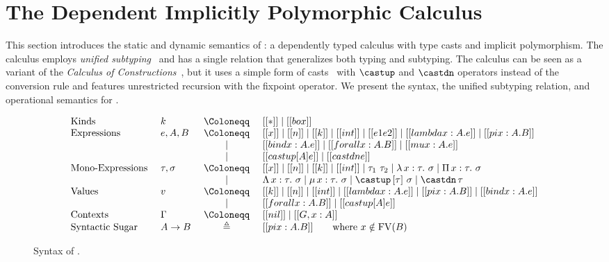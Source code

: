 \section{The Dependent Implicitly Polymorphic Calculus}
\label{sec:system}

This section introduces the static and dynamic semantics of
\name: a dependently typed calculus with type casts
and implicit polymorphism. The calculus employs
\emph{unified subtyping}~\citep{full}
and has a single relation that generalizes both typing and subtyping.
The calculus can be seen as a variant of the \emph{Calculus of Constructions}~\citep{coc},
but it uses a simple form of casts~\citep{isotype,yang2019pure} with $\castup$ and $\castdn$ operators
instead of the conversion rule and features unrestricted recursion with the fixpoint operator.
We present the syntax, the unified subtyping relation, and operational semantics for \name.

\begin{figure}[t]
\centering
\begin{equation*}
\begin{array}{llcl}
    \text{Kinds} & k & ~\Coloneqq ~ & [[*]] \mid [[box]] \\
    \text{Expressions} & e, A, B & ~ \Coloneqq ~ & [[x]] \mid [[n]] \mid [[k]] \mid [[int]] \mid [[e1 e2]] \mid [[lambda x : A. e]] \mid [[pi x : A. B]] \\
        & & \mid & [[bind x : A. e]] \mid [[forall x : A. B]] \mid [[mu x : A. e]] \\
        & & \mid & [[castup [A] e]] \mid [[castdn e]]   \\
    \text{Mono-Expressions} ~ & \tau, \sigma & ~ \Coloneqq ~ & [[x]] \mid [[n]] \mid [[k]] \mid [[int]] \mid \tau_1 ~ \tau_2 \mid \lambda \, x : \tau. ~ \sigma \mid \Pi \, x : \tau. ~ \sigma \\
        & & \mid & \Lambda \, x : \tau. ~ \sigma \mid \mu \, x : \tau. ~ \sigma \mid \castup \, [\tau]~ \sigma \mid \castdn \, \tau \\
    \text{Values} & v & ~ \Coloneqq ~ & [[k]] \mid [[n]] \mid [[int]] \mid [[lambda x : A. e]] \mid [[pi x : A. B]] \mid [[bind x : A. e]] \\
        & & \mid & [[forall x : A. B]] \mid [[castup [A] e]] \\
    \text{Contexts} & \Gamma & ~ \Coloneqq ~ & [[nil]] \mid [[G , x : A]] \\
    \text{Syntactic Sugar} ~ & A \rightarrow B & \triangleq & [[pi x : A. B]] \qquad \text{where} ~ x \notin \mathrm{FV}(B)
\end{array}
\end{equation*}
\caption{Syntax of \name.}
\label{fig:syntax}
\end{figure}
